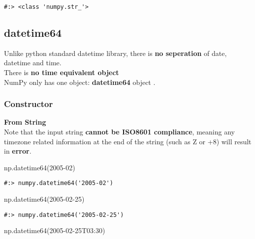 \documentclass[
]{book}
\newenvironment{Shaded}{\begin{snugshade}}{\end{snugshade}}
\newcommand{\NormalTok}[1]{#1}
\newcommand{\StringTok}[1]{\textcolor[rgb]{0.5,0.5,0.5}{#1}}
\begin{document}
\begin{verbatim}
#:> <class 'numpy.str_'>
\end{verbatim}

\hypertarget{datetime64}{%
\subsection{datetime64}\label{datetime64}}

Unlike python standard datetime library, there is \textbf{no seperation} of date, datetime and time.\\
There is \textbf{no time equivalent object}\\
NumPy only has one object: \textbf{datetime64} object .

\hypertarget{constructor-6}{%
\subsubsection{Constructor}\label{constructor-6}}

\textbf{From String}\\
Note that the input string \textbf{cannot be ISO8601 compliance}, meaning any timezone related information at the end of the string (such as Z or +8) will result in \textbf{error}.

\begin{Shaded}
\begin{Highlighting}[]
\NormalTok{np.datetime64(}\StringTok{\textquotesingle{}2005{-}02\textquotesingle{}}\NormalTok{)}
\end{Highlighting}
\end{Shaded}

\begin{verbatim}
#:> numpy.datetime64('2005-02')
\end{verbatim}

\begin{Shaded}
\begin{Highlighting}[]
\NormalTok{np.datetime64(}\StringTok{\textquotesingle{}2005{-}02{-}25\textquotesingle{}}\NormalTok{)}
\end{Highlighting}
\end{Shaded}

\begin{verbatim}
#:> numpy.datetime64('2005-02-25')
\end{verbatim}

\begin{Shaded}
\begin{Highlighting}[]
\NormalTok{np.datetime64(}\StringTok{\textquotesingle{}2005{-}02{-}25T03:30\textquotesingle{}}\NormalTok{)}
\end{Highlighting}
\end{Shaded}
\end{document}
